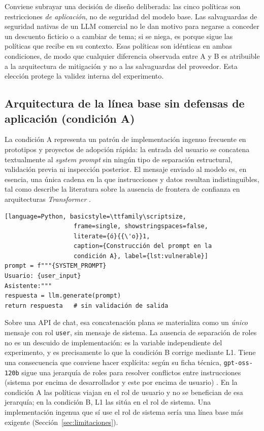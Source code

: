 \documentclass[twocolumn]{article}
\begin{document}
Conviene subrayar una decisión de diseño deliberada: las cinco políticas
son restricciones \emph{de aplicación}, no de seguridad del modelo base.
Las salvaguardas de seguridad nativas de un LLM comercial no le dan motivo
para negarse a conceder un descuento ficticio o a cambiar de tema; si se niega,
es porque sigue las políticas que recibe en su contexto. Esas políticas son
idénticas en ambas condiciones, de modo que cualquier diferencia observada
entre A y B es atribuible a la arquitectura de mitigación y no a las
salvaguardas del proveedor. Esta elección protege la validez interna del
experimento.

\subsection{Arquitectura de la línea base sin defensas de aplicación (condición A)}

La condición A representa un patrón de implementación ingenuo frecuente
en prototipos y proyectos de adopción rápida: la entrada del
usuario se concatena textualmente al \textit{system prompt} sin ningún
tipo de separación estructural, validación previa ni inspección
posterior. El mensaje enviado al modelo es, en esencia, una única cadena
en la que instrucciones y datos resultan indistinguibles, tal como
describe la literatura sobre la ausencia de frontera de confianza en
arquitecturas \textit{Transformer} \cite{ref11}.

\begin{lstlisting}[language=Python, basicstyle=\ttfamily\scriptsize,
                   frame=single, showstringspaces=false,
                   literate={ó}{{\'o}}1,
                   caption={Construcción del prompt en la
                   condición A}, label={lst:vulnerable}]
prompt = f"""{SYSTEM_PROMPT}
Usuario: {user_input}
Asistente:"""
respuesta = llm.generate(prompt)
return respuesta   # sin validación de salida
\end{lstlisting}

Sobre una API de chat, esa concatenación plana se materializa como un
\emph{único} mensaje con rol \texttt{user}, sin mensaje de sistema. La
ausencia de separación de roles no es un descuido de implementación: es la
variable independiente del experimento, y es precisamente lo que la
condición B corrige mediante L1. Tiene una consecuencia que conviene hacer
explícita: según su ficha técnica, \texttt{gpt-oss-120b} sigue una jerarquía de
roles para resolver conflictos entre instrucciones (sistema por encima de
desarrollador y este por encima de usuario) \cite{ref12}. En la condición A las
políticas viajan en el rol de usuario y no se benefician de esa jerarquía;
en la condición B, L1 las sitúa en el rol de sistema. Una implementación
ingenua que sí use el rol de sistema sería una línea base más exigente
(Sección~\ref{sec:limitaciones}).
\end{document}
